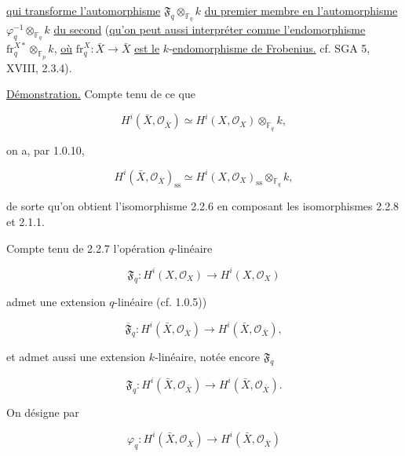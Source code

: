 \underline{qui transforme l'automorphisme}
$\mathfrak F_q\otimes_{\mathbb F_q}k$ \underline{du premier membre en l'automorphisme}
$\varphi_q^{-1}\otimes_{\mathbb F_q}k$ \underline{du second} (\underline{qu'on peut aussi interpréter
comme l'endomorphisme} $\mathrm{fr}_q^{X*}\otimes_{\mathbb F_p}k$, \underline{où}
$\mathrm{fr}_q^X:\bar X\longrightarrow\bar X$ \underline{est le} $k$-\underline{endomorphisme de
Frobenius.} cf. SGA 5, XVIII, 2.3.4).

\underline{Démonstration.} Compte tenu de ce que

\begin{equation}\tag{2.2.7}
H^i(\bar X,\mathcal O_{\bar X})\simeq
H^i(X,\mathcal O_X)\otimes_{\mathbb F_q}k,
\end{equation}

on a, par 1.0.10,

\begin{equation}\tag{2.2.8}
H^i(\bar X,\mathcal O_{\bar X})_{\mathrm{ss}}\simeq
H^i(X,\mathcal O_X)_{\mathrm{ss}}\otimes_{\mathbb F_q}k,
\end{equation}

de sorte qu'on obtient l'isomorphisme 2.2.6 en composant les isomorphismes
2.2.8 et 2.1.1.

Compte tenu de 2.2.7 l'opération $q$-linéaire

\begin{equation}\tag{2.2.9}
\mathfrak F_q:H^i(X,\mathcal O_X)\longrightarrow H^i(X,\mathcal O_X)
\end{equation}

admet une extension $q$-linéaire (cf. 1.0.5))

\begin{equation}\tag{2.2.10}
\overline{\mathfrak F}_q:H^i(\bar X,\mathcal O_{\bar X})
\longrightarrow H^i(\bar X,\mathcal O_{\bar X}),
\end{equation}

et admet aussi une extension $k$-linéaire, notée encore
$\mathfrak F_q$

\begin{equation}\tag{2.2.11}
\mathfrak F_q:H^i(\bar X,\mathcal O_{\bar X})
\longrightarrow H^i(\bar X,\mathcal O_{\bar X}).
\end{equation}


On désigne par

\begin{equation}\tag{2.2.12}
\varphi_q:H^i(\bar X,\mathcal O_{\bar X})
\longrightarrow H^i(\bar X,\mathcal O_{\bar X})
\end{equation}

